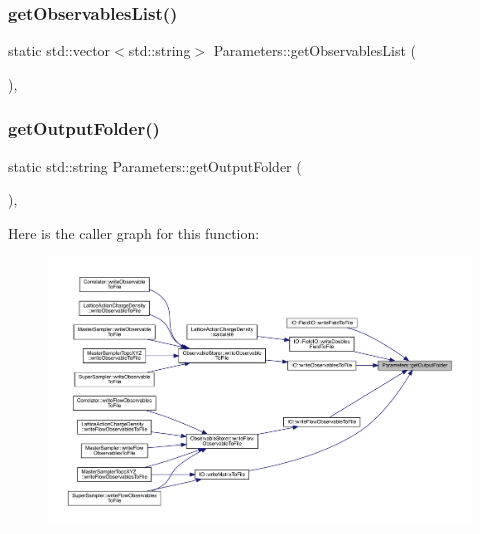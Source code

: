 \subsubsection{\texorpdfstring{getObservablesList()}{getObservablesList()}}
{\footnotesize\ttfamily static std\+::vector$<$std\+::string$>$ Parameters\+::get\+Observables\+List (\begin{DoxyParamCaption}{ }\end{DoxyParamCaption})\hspace{0.3cm}{\ttfamily [inline]}, {\ttfamily [static]}}

\mbox{\label{class_parameters_afa4cfe5dc4302b1e8f8928606ea9b056}} 
\subsubsection{\texorpdfstring{getOutputFolder()}{getOutputFolder()}}
{\footnotesize\ttfamily static std\+::string Parameters\+::get\+Output\+Folder (\begin{DoxyParamCaption}{ }\end{DoxyParamCaption})\hspace{0.3cm}{\ttfamily [inline]}, {\ttfamily [static]}}

Here is the caller graph for this function\+:\nopagebreak
\begin{figure}[H]
\begin{center}
\leavevmode
\includegraphics[width=350pt]{class_parameters_afa4cfe5dc4302b1e8f8928606ea9b056_icgraph}
\end{center}
\end{figure}
\mbox{\label{class_parameters_a778a2311c27854392c34c15bd4ea19f8}} 
